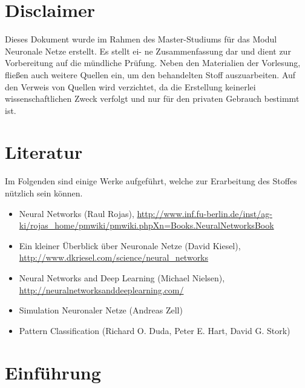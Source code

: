 \documentclass[fleqn,10pt]{SelfArx} %
\begin{document}

\section*{Disclaimer}
Dieses Dokument wurde im Rahmen des Master-Studiums
für das Modul Neuronale Netze erstellt. Es stellt ei-
ne Zusammenfassung dar und dient zur Vorbereitung auf die
mündliche Prüfung. Neben den Materialien der Vorlesung,
fließen auch weitere Quellen ein, um den behandelten Stoff
auszuarbeiten. Auf den Verweis von Quellen wird verzichtet,
da die Erstellung keinerlei wissenschaftlichen Zweck verfolgt
und nur für den privaten Gebrauch bestimmt ist.

\section*{Literatur}
Im Folgenden sind einige Werke aufgeführt, welche zur Erarbeitung des Stoffes nützlich sein können.
\begin{itemize}
	\item Neural Networks (Raul Rojas), \url{http://www.inf.fu-berlin.de/inst/ag-ki/rojas_home/pmwiki/pmwiki.phpXn=Books.NeuralNetworksBook}
	\item Ein kleiner Überblick über Neuronale Netze (David Kiesel), \url{http://www.dkriesel.com/science/neural_networks}
	\item Neural Networks and Deep Learning (Michael Nielsen), \url{http://neuralnetworksanddeeplearning.com/}
	\item Simulation Neuronaler Netze (Andreas Zell)
	\item Pattern Classification (Richard O. Duda, Peter E. Hart, David G. Stork) 
\end{itemize}

\section{Einführung} 

\end{document}
